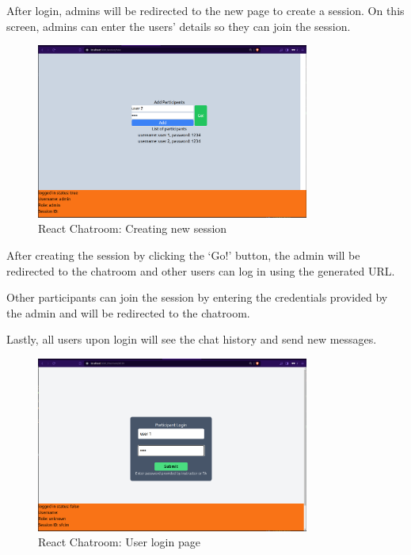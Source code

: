 After login, admins will be redirected to the new page to create a session. On this screen, admins can enter the users’ details so they can join the session.

\begin{figure}[H]
    \centering
    \includegraphics[width=0.8\textwidth]{diagrams/ChatroomNewSession.png}
    \caption{React Chatroom: Creating new session}
    \label{fig:enter-label}
\end{figure}

After creating the session by clicking the ‘Go!’ button, the admin will be redirected to the chatroom and other users can log in using the generated URL.

Other participants can join the session by entering the credentials provided by the admin and will be redirected to the chatroom.

Lastly, all users upon login will see the chat history and send new messages.

\begin{figure}[H]
    \centering
    \includegraphics[width=0.8\textwidth]{diagrams/ChatroomUserLogin.png}
    \caption{React Chatroom: User login page}
    \label{fig:enter-label}
\end{figure}

